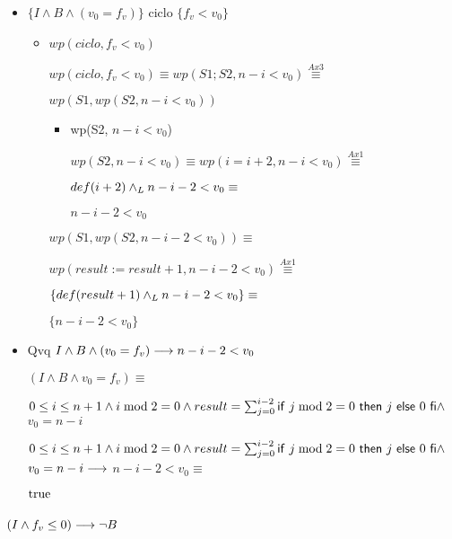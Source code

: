 \documentclass{article}
\begin{document}
\begin{itemize}
    \item $\{I \wedge B \wedge (v_{0} = f_{v})\}$ ciclo $\{f_{v} < v_{0}\}$

        \begin{itemize}
            \item $wp(ciclo, f_{v} < v_{0})$

            $wp(ciclo, f_{v} < v_{0}) \equiv wp(S1;S2, n - i < v_{0}) \stackrel{Ax3}{\equiv}$ 

            $wp(S1, wp(S2, n-i<v_{0}))$

            \begin{itemize}
                \item wp(S2, $n-i< v_{0}$)

                $wp(S2, n-i< v_{0}) \equiv wp(i=i+2, n-i<v_{0}) \stackrel{Ax1}{\equiv}$

                ${def(i+2) \land _L n-i-2 < v_{0}} \equiv$

                $n-i-2 < v_{0}$

            \end{itemize}

            $wp(S1, wp(S2, n-i-2 < v_{0})) \equiv$

            $wp(result:= result+1, n-i-2 < v_{0}) \stackrel{Ax1}{\equiv}$

            $\{def(result+1) \land _L n-i-2 < v_{0}\} \equiv$ 

            $\{n-i-2 < v_{0}\}$ 

        \end{itemize}

    \item Qvq $I \wedge B \wedge (v_{0} = f_{v}) \longrightarrow n-i-2 < v_{0}$
    
    $( I \wedge B \wedge v_{0}=f_{v}) \equiv $

    $0 \leq i \leq n+1 \wedge i \bmod 2 = 0 \wedge result = \sum_{j=0}^{i-2} \mathsf{if}\ j \bmod 2 = 0\ \mathsf{then}\ j\ \mathsf{else}\ 0\ \mathsf{fi} \wedge$
    $v_{0}=n-i$

    $0 \leq i \leq n+1 \wedge i \bmod 2 = 0 \wedge result = \sum_{j=0}^{i-2} \mathsf{if}\ j \bmod 2 = 0\ \mathsf{then}\ j\ \mathsf{else}\ 0\ \mathsf{fi} \wedge$
    $v_{0}=n-i \longrightarrow$
    $n-i-2 < v_{0} \equiv$
    
    $\mathrm{true}$

\end{itemize}


\subsubsection*{$(I \wedge f_{v} \leq 0) \longrightarrow \neg B$}
\end{document}
